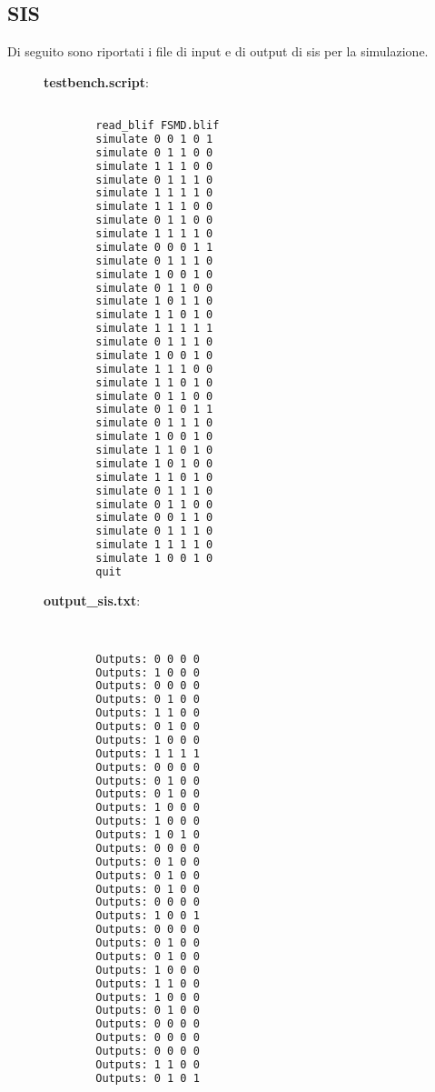 \documentclass[a4paper]{article}
\begin{document}
\subsection{SIS}
Di seguito sono riportati i file di input e di output di sis per la simulazione.
\begin{figure}[H]
	\centering
	\begin{minipage}{\linewidth}
		\centering
		\begin{minipage}{0.45\linewidth}
			\textbf{testbench.script}:
			\begin{lstlisting}[language=bash]

        read_blif FSMD.blif
        simulate 0 0 1 0 1
        simulate 0 1 1 0 0
        simulate 1 1 1 0 0
        simulate 0 1 1 1 0
        simulate 1 1 1 1 0
        simulate 1 1 1 0 0
        simulate 0 1 1 0 0
        simulate 1 1 1 1 0
        simulate 0 0 0 1 1
        simulate 0 1 1 1 0
        simulate 1 0 0 1 0
        simulate 0 1 1 0 0
        simulate 1 0 1 1 0
        simulate 1 1 0 1 0
        simulate 1 1 1 1 1
        simulate 0 1 1 1 0
        simulate 1 0 0 1 0
        simulate 1 1 1 0 0
        simulate 1 1 0 1 0
        simulate 0 1 1 0 0
        simulate 0 1 0 1 1
        simulate 0 1 1 1 0
        simulate 1 0 0 1 0
        simulate 1 1 0 1 0
        simulate 1 0 1 0 0
        simulate 1 1 0 1 0
        simulate 0 1 1 1 0
        simulate 0 1 1 0 0
        simulate 0 0 1 1 0
        simulate 0 1 1 1 0
        simulate 1 1 1 1 0
        simulate 1 0 0 1 0
        quit
      \end{lstlisting}
		\end{minipage}
		\hspace{0.05\linewidth}
		\begin{minipage}{0.45\linewidth}
			\textbf{output\_sis.txt}:
			\begin{lstlisting}[language=sh]


        Outputs: 0 0 0 0
        Outputs: 1 0 0 0
        Outputs: 0 0 0 0
        Outputs: 0 1 0 0
        Outputs: 1 1 0 0
        Outputs: 0 1 0 0
        Outputs: 1 0 0 0
        Outputs: 1 1 1 1
        Outputs: 0 0 0 0
        Outputs: 0 1 0 0
        Outputs: 0 1 0 0
        Outputs: 1 0 0 0
        Outputs: 1 0 0 0
        Outputs: 1 0 1 0
        Outputs: 0 0 0 0
        Outputs: 0 1 0 0
        Outputs: 0 1 0 0
        Outputs: 0 1 0 0
        Outputs: 0 0 0 0
        Outputs: 1 0 0 1
        Outputs: 0 0 0 0
        Outputs: 0 1 0 0
        Outputs: 0 1 0 0
        Outputs: 1 0 0 0
        Outputs: 1 1 0 0
        Outputs: 1 0 0 0
        Outputs: 0 1 0 0
        Outputs: 0 0 0 0
        Outputs: 0 0 0 0
        Outputs: 0 0 0 0
        Outputs: 1 1 0 0
        Outputs: 0 1 0 1

      \end{lstlisting}
		\end{minipage}
	\end{minipage}
\end{figure}
\end{document}
